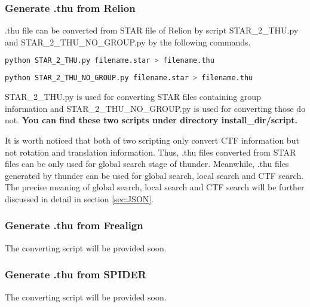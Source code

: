 \documentclass{article}
\begin{document}
            \subsubsection{Generate \textsf{.thu} from Relion}
            
            \textsf{.thu} file can be converted from STAR file of Relion by script \textsf{STAR\_2\_THU.py} and \textsf{STAR\_2\_THU\_NO\_GROUP.py} by the following commands.
               
            \begin{lstlisting}[language={sh}]
python STAR_2_THU.py filename.star > filename.thu
            \end{lstlisting}
            
            \begin{lstlisting}[language={sh}]
python STAR_2_THU_NO_GROUP.py filename.star > filename.thu
            \end{lstlisting}
            
            \textsf{STAR\_2\_THU.py} is used for converting STAR files containing group information and \textsf{STAR\_2\_THU\_NO\_GROUP.py} is used for converting those do not. \textbf{You can find these two scripts under directory \textsf{install\_dir/script}.}
            
            It is worth noticed that both of two scripting only convert CTF information but not rotation and translation information. Thus, \textsf{.thu} files converted from STAR files can be only used for global search stage of \textsf{thunder}. Meanwhile, \textsf{.thu} files generated by \textsf{thunder} can be used for global search, local search and CTF search. The precise meaning of global search, local search and CTF search will be further discussed in detail in section \ref{sec:JSON}.
            
            \subsubsection{Generate \textsf{.thu} from Frealign}
            
            The converting script will be provided soon.
            
            \subsubsection{Generate \textsf{.thu} from SPIDER}
            
            The converting script will be provided soon.
    
\end{document}
